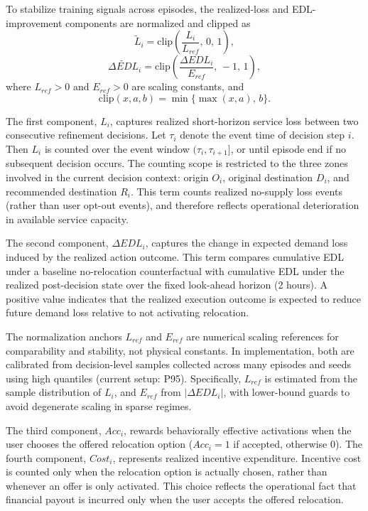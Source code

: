 To stabilize training signals across episodes, the realized-loss and EDL-improvement components are normalized and clipped as
\begin{equation}
\widetilde{L}_i
=
\mathrm{clip}\!\left(
\frac{L_i}{L_{ref}},\,0,\,1
\right),
\end{equation}
\begin{equation}
\widetilde{\Delta EDL}_i
=
\mathrm{clip}\!\left(
\frac{\Delta EDL_i}{E_{ref}},\,-1,\,1
\right),
\end{equation}
where \(L_{ref}>0\) and \(E_{ref}>0\) are scaling constants, and
\[
\mathrm{clip}(x,a,b)=\min\{\max(x,a),\,b\}.
\]

The first component, \(L_i\), captures realized short-horizon service loss between two consecutive refinement decisions. Let \(\tau_i\) denote the event time of decision step \(i\). Then \(L_i\) is counted over the event window \((\tau_i,\tau_{i+1}]\), or until episode end if no subsequent decision occurs. The counting scope is restricted to the three zones involved in the current decision context: origin \(O_i\), original destination \(D_i\), and recommended destination \(R_i\). This term counts realized no-supply loss events (rather than user opt-out events), and therefore reflects operational deterioration in available service capacity.

The second component, \(\Delta EDL_i\), captures the change in expected demand loss induced by the realized action outcome. This term compares cumulative EDL under a baseline no-relocation counterfactual with cumulative EDL under the realized post-decision state over the fixed look-ahead horizon (2 hours). A positive value indicates that the realized execution outcome is expected to reduce future demand loss relative to not activating relocation.

The normalization anchors \(L_{ref}\) and \(E_{ref}\) are numerical scaling references for comparability and stability, not physical constants. In implementation, both are calibrated from decision-level samples collected across many episodes and seeds using high quantiles (current setup: P95). Specifically, \(L_{ref}\) is estimated from the sample distribution of \(L_i\), and \(E_{ref}\) from \(|\Delta EDL_i|\), with lower-bound guards to avoid degenerate scaling in sparse regimes.

The third component, \(Acc_i\), rewards behaviorally effective activations when the user chooses the offered relocation option (\(Acc_i=1\) if accepted, otherwise \(0\)). The fourth component, \(Cost_i\), represents realized incentive expenditure. Incentive cost is counted only when the relocation option is actually chosen, rather than whenever an offer is only activated. This choice reflects the operational fact that financial payout is incurred only when the user accepts the offered relocation.

